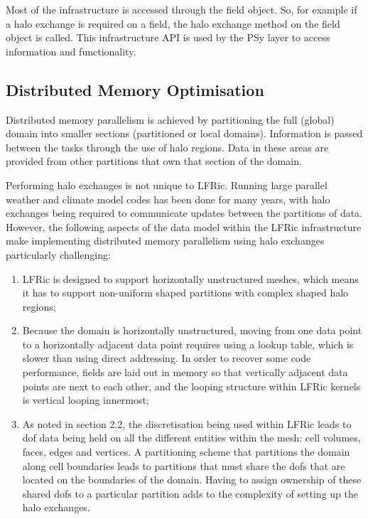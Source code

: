 \documentclass[review,times]{elsarticle}
\begin{document}
Most of the infrastructure is accessed through the field object. So, for
example if a halo exchange is required on a field, the halo exchange
method on the field object is called. This infrastructure
API is used by the PSy layer to access information and functionality.

\subsection{\label{sec:sub:distmem}Distributed Memory Optimisation}

Distributed memory parallelism is achieved by partitioning the full
(global) domain into smaller sections (partitioned or local domains).
Information is passed between the tasks through the use of halo regions.
Data in these areas are provided from other partitions that own that
section of the domain.

Performing halo exchanges is not unique to LFRic. Running large parallel
weather and climate model codes has been done for many years, with halo
exchanges being required to communicate updates between the partitions of 
data. However, the following aspects of the data model within the LFRic 
infrastructure make implementing distributed memory parallelism using 
halo exchanges particularly challenging:

\begin{enumerate}

\item LFRic is designed to support horizontally unstructured meshes,
which means it has to support non-uniform shaped partitions with complex
shaped halo regions;

\item Because the domain is horizontally unstructured, moving from one
data point to a horizontally adjacent data point requires using a lookup
table, which is slower than using direct addressing. In order to recover
some code performance, fields are laid out in memory so that vertically
adjacent data points are next to each other, and the looping structure
within LFRic kernels is vertical looping innermost;

\item As noted in section 2.2, the discretisation being used within LFRic
leads to dof data being held on all the different entities within the mesh: 
cell volumes, faces, edges and vertices. A partitioning scheme that partitions
the domain along cell boundaries leads to partitions that must share the
dofs that are located on the boundaries of the domain. Having to assign
ownership of these shared dofs to a particular partition adds to the
complexity of setting up the halo exchanges.

\end{enumerate}
\end{document}
